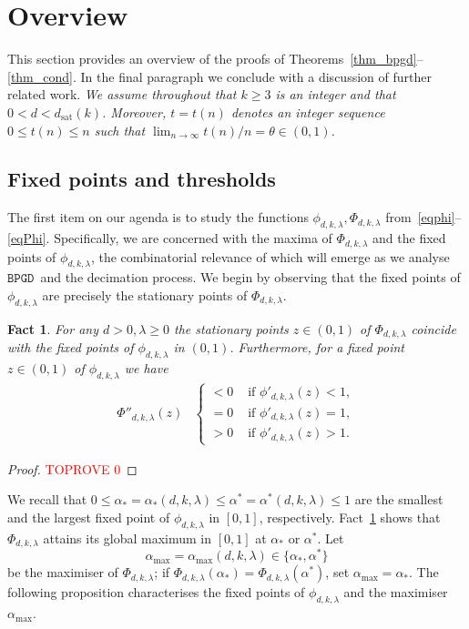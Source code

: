 \documentclass[10pt,reqno]{amsart}
\numberwithin{equation}{section}
\newcommand\dsat{d_{\mathrm{sat}}}
\newcommand{\amax}{\alpha_{\max}}
\newcommand{\BPGD}{\ensuremath{\mathtt{BPGD}}}
\newcommand\Thm{Theorem}
\newtheorem{fact}[definition]{Fact}
\newcommand{\ph}{\phi_{d,k,\lambda}}
\newcommand{\Ph}{\Phi_{d,k,\lambda}}
\begin{document}
\section{Overview}\label{sec_over}

\noindent
This section provides an overview of the proofs of \Thm s~\ref{thm_bpgd}--\ref{thm_cond}.
In the final paragraph we conclude with a discussion of further related work.
{\em We assume throughout that $k\geq3$ is an integer and that $0<d<\dsat(k)$. Moreover, $t=t(n)$ denotes an integer sequence $0\leq t(n)\leq n$ such that $\lim_{n\to\infty}t(n)/n=\theta\in(0,1)$.}


\subsection{Fixed points and thresholds}\label{sec_calc}
The first item on our agenda is to study the functions $\ph,\Ph$ from~\eqref{eqphi}--\eqref{eqPhi}.
Specifically, we are concerned with the maxima of $\Ph$ and the fixed points of $\ph$, the combinatorial relevance of which will emerge as we analyse \BPGD\ and the decimation process.
We begin by observing that the fixed points of $\ph$ are precisely the stationary points of $\Ph$.

\begin{fact}\label{lem_max}
	For any $d>0,\lambda\geq0$ the stationary points $z\in(0,1)$ of $\Phi_{d,k,\lambda}$ coincide with the fixed points of $\phi_{d,k,\lambda}$ in $(0,1)$.
	Furthermore, for a fixed point $z\in(0,1)$ of $\phi_{d,k,\lambda}$ we have
	\begin{align}\label{eq_lem_max}
		\Phi''_{d,k,\lambda}(z)&\begin{cases}
			<0&\mbox{ if }\phi'_{d,k,\lambda}(z)<1,\\
			=0&\mbox{ if }\phi'_{d,k,\lambda}(z)=1,\\
			>0&\mbox{ if }\phi'_{d,k,\lambda}(z)>1.
			\end{cases}
	\end{align}
\end{fact}
\begin{proof}\textcolor{red}{TOPROVE 0}\end{proof}

We recall that $0\leq\alpha_*=\alpha_*(d,k,\lambda)\leq\alpha^*=\alpha^*(d,k,\lambda)\leq1$ are the smallest and the largest fixed point of $\ph$ in $[0,1]$, respectively.
Fact~\ref{lem_max} shows that $\Ph$ attains its global maximum in $[0,1]$ at $\alpha_*$ or $\alpha^*$.
Let $$\amax=\amax(d,k,\lambda)\in\{\alpha_*,\alpha^*\}$$ be the maximiser of $\Ph$; if $\Ph(\alpha_*)=\Ph(\alpha^*)$, set $\amax=\alpha_*$.
The following proposition characterises the fixed points of $\ph$ and the maximiser $\amax$.
\end{document}
